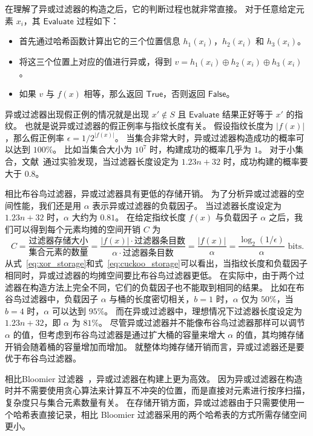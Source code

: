 在理解了异或过滤器的构造之后，它的判断过程也就非常直接。
对于任意给定元素 $x_i$，其 $\mathsf{Evaluate}$ 过程如下：
\begin{itemize}
  \item 首先通过哈希函数计算出它的三个位置信息 $h_1(x_i)$，$h_2(x_i)$ 和 $h_3(x_i)$。
  \item 将这三个位置上对应的值进行异或，得到 $v = h_1(x_i) \oplus h_2(x_i) \oplus h_3(x_i)$。
  \item 如果 $v$ 与 $f(x)$ 相等，那么返回 $\mathsf{True}$，否则返回 $\mathsf{False}$。
\end{itemize}

异或过滤器出现假正例的情况就是出现 $x'\notin S$ 且 $\mathsf{Evaluate}$ 结果正好等于 $x'$ 的指纹。
也就是说异或过滤器的假正例率与指纹长度有关。
假设指纹长度为 $|f(x)|$，那么假正例率 $\epsilon = 1 / 2^|f(x)|$。
当集合非常大时，异或过滤器构造成功的概率可以达到 $100\%$。
比如当集合大小为 $10^7$ 时，构建成功的概率几乎为 $1$。
对于小集合，文献~\cite{graf2020xor}通过实验发现，当过滤器长度设定为 $1.23 n + 32$ 时，成功构建的概率要大于 $0.8$。

相比布谷鸟过滤器，异或过滤器具有更低的存储开销。
为了分析异或过滤器的空间性能，我们还是用 $\alpha$ 表示异或过滤器的负载因子。
当过滤器长度设定为 $1.23n + 32$ 时，$\alpha$ 大约为 $0.81$。
在给定指纹长度 $f(x)$ 与负载因子 $\alpha$ 之后，我们可以得到每个元素均摊的空间开销 $C$ 为
\begin{equation}
  C = \frac{\mbox{过滤器存储大小}}{\mbox{集合元素的数量}} = \frac{|f(x)| \cdot \mbox{过滤器条目数}}{\alpha \cdot \mbox{过滤器条目数}} = \frac{|f(x)|}{\alpha} = \frac{\log_2(1/\epsilon)}{\alpha} \mbox{ bits}.
  \label{eq:xor_storage}
\end{equation}
从式~\ref{eq:xor_storage}和式~\ref{eq:cuckoo_storage}可以看出，当指纹长度和负载因子相同时，异或过滤器的均摊空间要比布谷鸟过滤器更低。
在实际中，由于两个过滤器在构造方法上完全不同，它们的负载因子也不能取到相同的结果。
比如在布谷鸟过滤器中，负载因子 $\alpha$ 与桶的长度密切相关，$b=1$ 时，$\alpha$ 仅为 $50\%$，当 $b=4$ 时，$\alpha$ 可以达到 $95\%$。
而在异或过滤器中，理想情况下过滤器长度设定为 $1.23n + 32$，即 $\alpha$ 为 $81\%$。
尽管异或过滤器并不能像布谷鸟过滤器那样可以调节 $\alpha$ 的值，但考虑到布谷鸟过滤器是通过扩大桶的容量来增大 $\alpha$ 的值，其均摊存储开销会随着桶的容量增加而增加。
就整体均摊存储开销而言，异或过滤器还是要优于布谷鸟过滤器。


相比Bloomier 过滤器~\cite{chazelle2004bloomier}，异或过滤器在构建上更为高效。
因为异或过滤器在构造时并不需要使用贪心算法来计算互不冲突的位置，而是直接对元素进行按序扫描，复杂度只与集合元素数量有关。
在存储开销方面，异或过滤器由于只需要使用一个哈希表直接记录，相比 Bloomier 过滤器采用的两个哈希表的方式所需存储空间更小。

